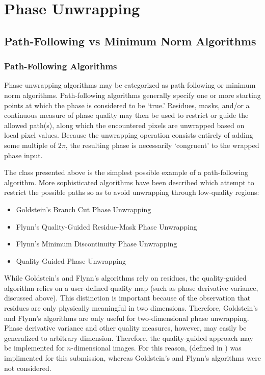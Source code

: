 \section{Phase Unwrapping}

\subsection{Path-Following vs Minimum Norm Algorithms}

\subsubsection{Path-Following Algorithms}

Phase unwrapping algorithms may be categorized as path-following or minimum norm algorithms.  Path-following algorithms generally specify one or more starting points at which the phase is considered to be `true.'  Residues, masks, and/or a continuous measure of phase quality may then be used to restrict or guide the allowed path(s), along which the encountered pixels are unwrapped based on local pixel values.  Because the unwrapping operation consists entirely of adding some multiple of $2\pi$, the resulting phase is necessarily `congruent' to the wrapped phase input.

The  class presented above is the simplest possible example of a path-following algorithm.  More sophisticated algorithms have been described which attempt to restrict the possible paths so as to avoid unwrapping through low-quality regions:

\begin{itemize}

\item Goldstein's Branch Cut Phase Unwrapping \cite{Goldstein1988}
\item Flynn's Quality-Guided Residue-Mask Phase Unwrapping \cite{Flynn1996}
\item Flynn's Minimum Discontinuity Phase Unwrapping \cite{Flynn1997}
\item Quality-Guided Phase Unwrapping

\end{itemize}

While Goldstein's and Flynn's algorithms rely on residues, the quality-guided algorithm relies on a user-defined quality map (such as phase derivative variance, discussed above).  This distinction is important because of the observation that residues are only physically meaningful in two dimensions.  Therefore, Goldstein's and Flynn's algorithms are only useful for two-dimensional phase unwrapping.  Phase derivative variance and other quality measures, however, may easily be generalized to arbitrary dimension.  Therefore, the quality-guided approach may be implemented for $n$-dimensional images.  For this reason,  (defined in ) was implimented for this submission, whereas Goldstein's and Flynn's algorithms were not considered.

